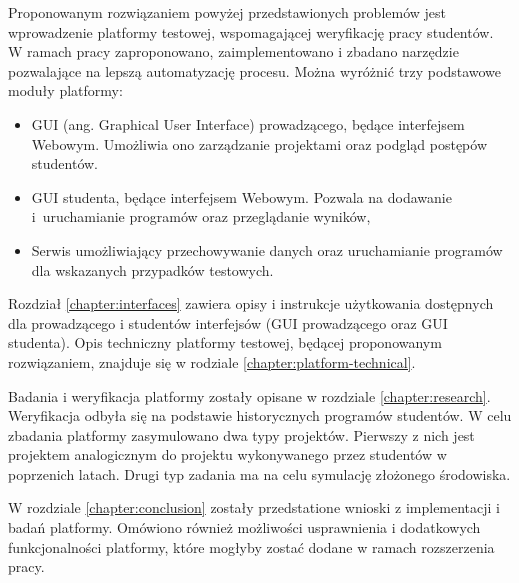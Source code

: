 Proponowanym rozwiązaniem powyżej przedstawionych problemów jest wprowadzenie platformy testowej, wspomagającej weryfikację pracy studentów.
W ramach pracy zaproponowano, zaimplementowano i zbadano narzędzie pozwalające na lepszą automatyzację procesu.
Można wyróżnić trzy podstawowe moduły platformy:
\begin{itemize}
    \item GUI (ang. Graphical User Interface) prowadzącego, będące interfejsem Webowym. Umożliwia ono zarządzanie projektami oraz podgląd postępów studentów.
    \item GUI studenta, będące interfejsem Webowym. Pozwala na dodawanie i~uruchamianie programów oraz przeglądanie wyników,
    \item Serwis umożliwiający przechowywanie danych oraz uruchamianie programów dla wskazanych przypadków testowych.
\end{itemize}
Rozdział \ref{chapter:interfaces} zawiera opisy i instrukcje użytkowania dostępnych dla prowadzącego i studentów interfejsów (GUI prowadzącego oraz GUI studenta).
Opis techniczny platformy testowej, będącej proponowanym rozwiązaniem, znajduje się w rodziale \ref{chapter:platform-technical}.

Badania i weryfikacja platformy zostały opisane w rozdziale \ref{chapter:research}.
Weryfikacja odbyła się na podstawie historycznych programów studentów.
W celu zbadania platformy zasymulowano dwa typy projektów.
Pierwszy z nich jest projektem analogicznym do projektu wykonywanego przez studentów w poprzenich latach.
Drugi typ zadania ma na celu symulację złożonego środowiska.

W rozdziale \ref{chapter:conclusion} zostały przedstatione wnioski z implementacji i badań platformy.
Omówiono również możliwości usprawnienia i dodatkowych funkcjonalności platformy, które mogłyby zostać dodane w ramach rozszerzenia pracy.





